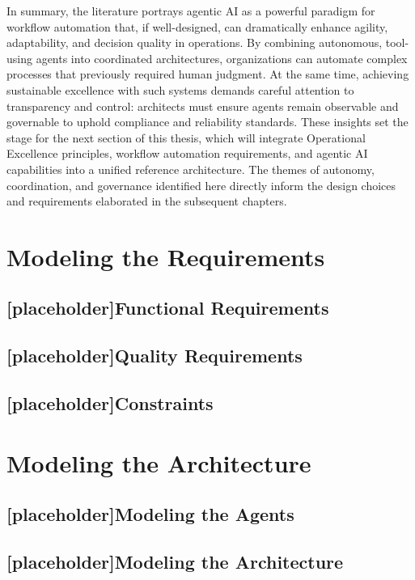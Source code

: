 In summary, the literature portrays agentic AI as a powerful paradigm for workflow automation that, if well-designed, can dramatically enhance agility, adaptability, and decision quality in operations. By combining autonomous, tool-using agents into coordinated architectures, organizations can automate complex processes that previously required human judgment. At the same time, achieving sustainable excellence with such systems demands careful attention to transparency and control: architects must ensure agents remain observable and governable to uphold compliance and reliability standards. These insights set the stage for the next section of this thesis, which will integrate Operational Excellence principles, workflow automation requirements, and agentic AI capabilities into a unified reference architecture. The themes of autonomy, coordination, and governance identified here directly inform the design choices and requirements elaborated in the subsequent chapters. 

\section{Modeling the Requirements}\label{sec:mod-req}
\subsection{[placeholder]Functional Requirements}\label{subse:func-req}
\subsection{[placeholder]Quality Requirements}\label{subse:qua-req}
\subsection{[placeholder]Constraints}\label{subse:const}

\section{Modeling the Architecture}\label{sec:mod-mas}
\subsection{[placeholder]Modeling the Agents}\label{subse:mod-agents}
\subsection{[placeholder]Modeling the Architecture}\label{subse:mod-arch}
